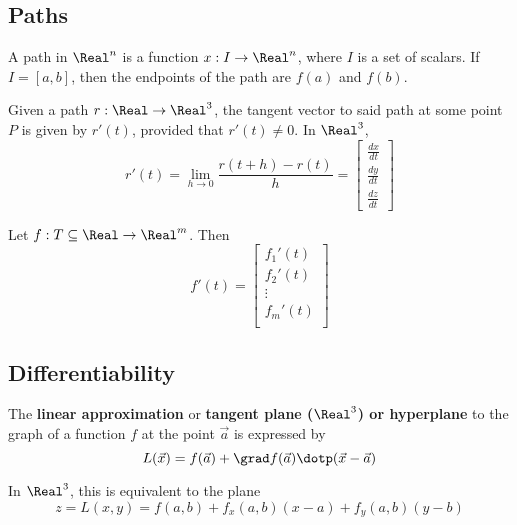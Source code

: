 \subsection{Paths}


\begin{definition}[Path]
  A path in $\Real^n$ is a function $x : I \to \Real^n$, where $I$ is a set of scalars. If $I = [a, b]$, then the endpoints of the path are $f(a)$ and $f(b)$.
\end{definition}

\begin{definition}
  Given a path $r : \Real \to \Real^3$, the tangent vector to said path at some point $P$ is given by $r'(t)$, provided that $r'(t) \neq 0$. In $\Real^3$,
  \[
    r'(t) = \lim_{h \to 0} \frac{r(t + h) - r(t)}{h} = \begin{bmatrix}
      \frac{dx}{dt} \\
      \frac{dy}{dt} \\
      \frac{dz}{dt}
    \end{bmatrix}
  \]
\end{definition}

\begin{definition}
  Let $f : T \subseteq \Real \to \Real^m$. Then
  \[
    f'(t) = \begin{bmatrix}
      f_1'(t) \\
      f_2'(t) \\
      \vdots \\
      f_m'(t) \\
    \end{bmatrix}
  \]
\end{definition}

\subsection{Differentiability}


\begin{definition}
  The \textbf{linear approximation} or \textbf{tangent plane ($\Real^3$) or hyperplane} to the graph of a function $f$ at the point $\vec{a}$ is expressed by
  \[
    L(\vec{x}) = f(\vec{a}) + \grad f(\vec{a}) \dotp (\vec{x} - \vec{a})
  \]

  In $\Real^3$, this is equivalent to the plane
  \[
    z = L(x, y) = f(a, b) + f_x(a, b) (x - a) + f_y(a, b) (y - b)
  \]
\end{definition}

